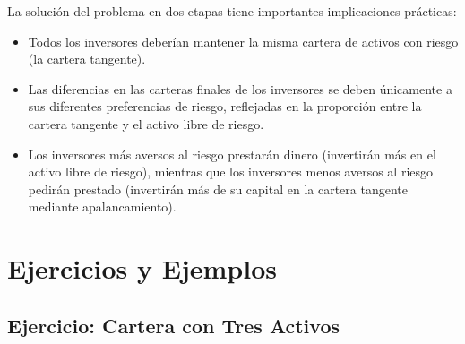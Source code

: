 La solución del problema en dos etapas tiene importantes implicaciones prácticas:
\begin{itemize}
\item Todos los inversores deberían mantener la misma cartera de activos con riesgo (la cartera tangente).
\item Las diferencias en las carteras finales de los inversores se deben únicamente a sus diferentes preferencias de riesgo, reflejadas en la proporción entre la cartera tangente y el activo libre de riesgo.
\item Los inversores más aversos al riesgo prestarán dinero (invertirán más en el activo libre de riesgo), mientras que los inversores menos aversos al riesgo pedirán prestado (invertirán más de su capital en la cartera tangente mediante apalancamiento).
\end{itemize}

\section{Ejercicios y Ejemplos}

\subsection{Ejercicio: Cartera con Tres Activos}

